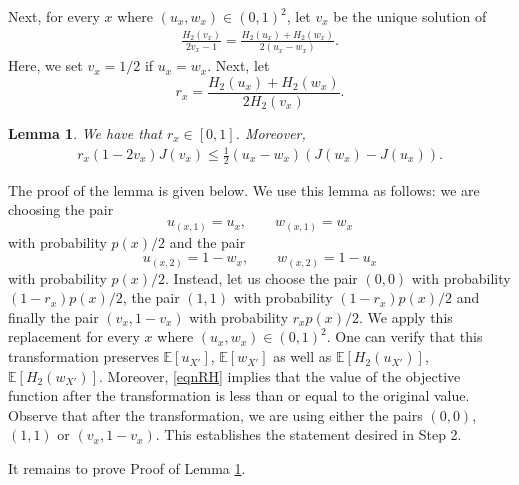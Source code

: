 \documentclass[conference,letterpaper,onecolumn]{IEEEtran}
\theoremstyle{plain}%
\newtheorem{lemma}[thm]{Lemma}
\begin{document}
Next, for every $x$ where $(u_x,w_x)\in(0,1)^2$, let $v_x$ be the unique solution of
\begin{align*}
    \frac{H_2(v_x)}{2v_x - 1} = \frac{H_2(u_x) + H_2(w_x)}{2(u_x-w_x)}.
\end{align*}
Here, we set $v_x=1/2$ if $u_x=w_x$. Next, let
$$r_x =\frac{H_2(u_x) + H_2(w_x)}{2H_2(v_x)}.$$
\begin{lemma}\label{lmmnr}
    We have that 
$r_x\in[0,1]$. Moreover, 
\begin{align}
    r_x(1 - 2v_x)J(v_x) \leq \frac{1}{2}(u_x - w_x)(J(w_x) - J(u_x)).\label{eqnRH}
\end{align}
\end{lemma}
The proof of the lemma is given below. We use this lemma as follows: we are choosing the pair
$$u_{(x,1)}=u_x, \qquad w_{(x,1)}=w_x$$
with probability $p(x)/2$ and the pair
$$u_{(x,2)}=1-w_x, \qquad w_{(x,2)}=1-u_x$$
with probability $p(x)/2$. Instead, let us choose the pair
$(0,0)$ with probability $(1-r_x)p(x)/2$, the pair
$(1,1)$ with probability $(1-r_x)p(x)/2$ and finally the pair $(v_x,1-v_x)$ with probability $r_xp(x)/2$. We apply this replacement for every $x$ where $(u_x,w_x)\in(0,1)^2$. One can verify that this transformation preserves $\mathbb{E}[u_{X'}]$, $\mathbb{E}[w_{X'}]$ as well as $\mathbb{E}[H_2(u_{X'})]$, $\mathbb{E}[H_2(w_{X'})]$. Moreover, 
\eqref{eqnRH} implies that the value of the objective function after the transformation is less than or equal to the original value. Observe that after the transformation, we are using either the pairs $(0,0)$, $(1,1)$ or $(v_x,1-v_x)$. This establishes the statement desired in Step 2. 

It remains to prove Proof of Lemma \ref{lmmnr}. 
\end{document}
